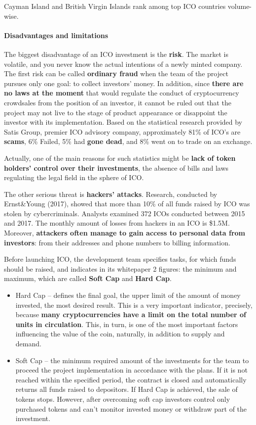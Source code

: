 Cayman Island and British Virgin Islands rank among top ICO countries volume-wise.

\paragraph{Disadvantages and limitations}
The biggest disadvantage of an ICO investment is the \textbf{risk}. The market is volatile, and you never know the actual intentions of a newly minted company. The first risk can be called \textbf{ordinary fraud} when the team of the project pursues only one goal: to collect investors' money.
In addition, since \textbf{there are no laws at the moment} that would regulate the conduct of cryptocurrency crowdsales from the position of an investor, it cannot be ruled out that the project may not live to the stage of product appearance or disappoint the investor with its implementation.
Based on the statistical research provided by Satis Group, premier ICO advisory company, approximately 81\% of ICO's are \textbf{scams}, 6\% Failed, 5\% had \textbf{gone dead}, and 8\% went on to trade on an exchange.

Actually, one of the main reasons for such statistics might be \textbf{lack of token holders' control over their investments}, the absence of bills and laws regulating the legal field in the sphere of ICO.

The other serious threat is \textbf{hackers' attacks}. Research, conducted by Ernst\&Young (2017), showed that more than 10\% of all funds raised by ICO was stolen by cybercriminals. Analysts examined 372 ICOs conducted between 2015 and 2017. The monthly amount of losses from hackers in an ICO is \$1.5M. Moreover, \textbf{attackers often manage to gain access to personal data from investors}: from their addresses and phone numbers to billing information.

Before launching ICO, the development team specifies tasks, for which funds should be raised, and indicates in its whitepaper 2 figures: the minimum and maximum, which are called \textbf{Soft Cap} and \textbf{Hard Cap}.

\begin{itemize}
	\item Hard Cap -- defines the final goal, the upper limit of the amount of money invested, the most desired result. This is a very important indicator, precisely, because \textbf{many cryptocurrencies have a limit on the total number of units in circulation}. This, in turn, is one of the most important factors influencing the value of the coin, naturally, in addition to supply and demand.
	\item Soft Cap -- the minimum required amount of the investments for the team to proceed the project implementation in accordance with the plans. If it is not reached within the specified period, the contract is closed and automatically returns all funds raised to depositors. If Hard Cap is achieved, the sale of tokens stops. However, after overcoming soft cap investors control only purchased tokens and can't monitor invested money or withdraw part of the investment.
\end{itemize}

